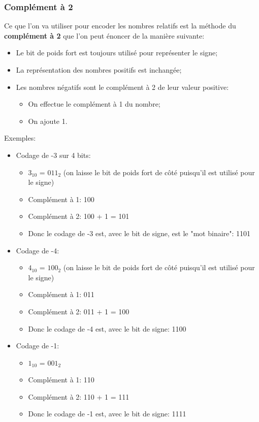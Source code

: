 \documentclass[12pt]{article}
\begin{document}
	\subsubsection*{Complément à 2}
	Ce que l'on va utiliser pour encoder les nombres relatifs est la méthode du \textbf{complément à 2} que l'on peut énoncer de la manière suivante:
	\begin{itemize}
		\item Le bit de poids fort est toujours utilisé pour représenter le signe;
		\item La représentation des nombres positifs est inchangée;
		\item Les nombres négatifs sont le complément à 2 de leur valeur positive:
		\begin{itemize}
			\item On effectue le complément à 1 du nombre;
			\item On ajoute 1.
		\end{itemize} 
	\end{itemize}
	
	Exemples:
	\begin{itemize}
		\item Codage de -3 sur 4 bits:
		\begin{itemize}
			\item $3_{10}$ = $011_2$ (on laisse le bit de poids fort de côté puisqu'il est utilisé pour le signe)
			\item Complément à 1: 100
			\item Complément à 2: 100 + 1 = 101
			\item Donc le codage de -3 est, avec le bit de signe, est le "mot binaire": 1101 
		\end{itemize}
		\item Codage de -4:
		\begin{itemize}
			\item $4_{10}$ = $100_2$ (on laisse le bit de poids fort de côté puisqu'il est utilisé pour le signe)
			\item Complément à 1: 011
			\item Complément à 2: 011 + 1 = 100
			\item Donc le codage de -4 est, avec le bit de signe: 1100
		\end{itemize}
		\item Codage de -1:
		\begin{itemize}
			\item $1_{10}$ = $001_2$
			\item Complément à 1: 110
			\item Complément à 2: 110 + 1 = 111
			\item Donc le codage de -1 est, avec le bit de signe: 1111
		\end{itemize}
	\end{itemize}
	
\end{document}
